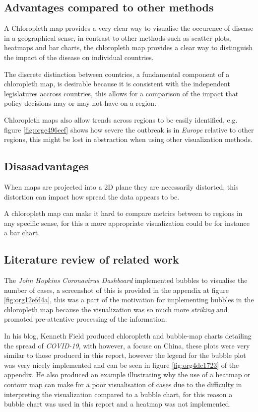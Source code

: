 \documentclass[11pt]{article}
\begin{document}
\subsection{Advantages compared to other methods}
\label{sec:org013a2e0}
A Chloropleth map provides a very clear way to visualise the occurence of
disease in a geographical sense, in contrast to other methods such as scatter
plots, heatmaps and bar charts, the chloropleth map provides a clear way to
distinguish the impact of the disease on individual countries.

The discrete distinction between countries, a fundamental component of a
chloropleth map, is desirable because it is consistent with the independent
legislatures accross countries, this allows for a comparison of the impact
that policy decisions may or may not have on a region.

Chloropleth maps also allow trends across regions to be easily identified, e.g.
figure \ref{fig:orge496eef} shows how severe the outbreak is in \emph{Europe} relative to other
regions, this might be lost in abstraction when using other visualization methods.

\subsection{Disasadvantages}
\label{sec:org69d7554}
When maps are projected into a 2D plane they are necessarily distorted, this
distortion can impact how spread the data appears to be.

A chloropleth map can make it hard to compare metrics between to regions in any
specific sense, for this a more appropriate visualization could be for instance a bar chart.
\subsection{Literature review of related work}
\label{sec:orga1df4d1}
The \emph{John Hopkins Coronavirus Dashboard} \cite{2020o} implemented bubbles to
visualise the number of cases, a screenshot of this is provided in the appendix
at figure \ref{fig:org12efd4a}, this was a part of the motivation for implementing bubbles in
the chloropleth map because the visualization was so much more \emph{striking} and
promoted pre-attentive processing of the information.

\label{org8f6675a} In his blog, Kenneth Field produced chloropleth and bubble-map charts
detailing the spread of \emph{COVID-19}, with however, a focuse on China, \cite{field2020} these
plots were very similar to those produced in this report, however the legend for
the bubble plot was very nicely implemented and can be seen in figure \ref{fig:org4dc1723} of
the appendix. He also produced an example illustrating why the use of a heatmap
or contour map can make for a poor visualisation of cases due to the difficulty
in interpreting the visualization compared to a bubble chart, for this reason a
bubble chart was used in this report and a heatmap was not implemented.
\end{document}
